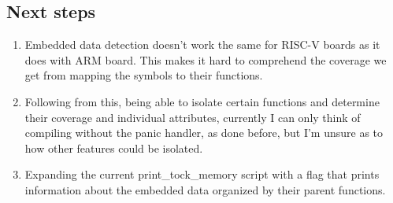 \documentclass{article}
\begin{document}
\subsection{Next steps}
\begin{enumerate}
    \item Embedded data detection doesn't work the same for RISC-V boards as it does with ARM board. This makes it hard to comprehend the coverage we get from mapping the symbols to their functions.
    
    \item Following from this, being able to isolate certain functions and determine their coverage and individual attributes, currently I can only think of compiling without the panic handler, as done before, but I'm unsure as to how other features could be isolated.
    
    \item Expanding the current print\_tock\_memory script with a flag that prints information about the embedded data organized by their parent functions.
\end{enumerate}
\end{document}
